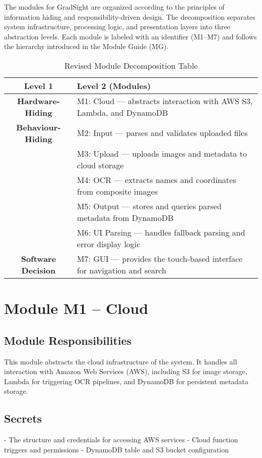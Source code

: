 \documentclass[12pt, titlepage]{article}
\begin{document}
The modules for GradSight are organized according to the principles of information hiding and responsibility-driven design. The decomposition separates system infrastructure, processing logic, and presentation layers into three abstraction levels. Each module is labeled with an identifier (M1–M7) and follows the hierarchy introduced in the Module Guide (MG).

\begin{table}[H]
\centering
\caption{Revised Module Decomposition Table}
\begin{tabular}{|c|l|}
\hline
\textbf{Level 1} & \textbf{Level 2 (Modules)} \\
\hline
\textbf{Hardware-Hiding} &
M1: Cloud — abstracts interaction with AWS S3, Lambda, and DynamoDB \\
\hline
\textbf{Behaviour-Hiding} &
M2: Input — parses and validates uploaded files \\
& M3: Upload — uploads images and metadata to cloud storage \\
& M4: OCR — extracts names and coordinates from composite images \\
& M5: Output — stores and queries parsed metadata from DynamoDB \\
& M6: UI Parsing — handles fallback parsing and error display logic \\
\hline
\textbf{Software Decision} &
M7: GUI — provides the touch-based interface for navigation and search \\
\hline
\end{tabular}
\end{table}

\section{Module M1 – Cloud}
\label{SecM1}

\subsection*{Module Responsibilities}
This module abstracts the cloud infrastructure of the system. It handles all interaction with Amazon Web Services (AWS), including S3 for image storage, Lambda for triggering OCR pipelines, and DynamoDB for persistent metadata storage.

\subsection*{Secrets}
- The structure and credentials for accessing AWS services  
- Cloud function triggers and permissions  
- DynamoDB table and S3 bucket configuration  
\end{document}
